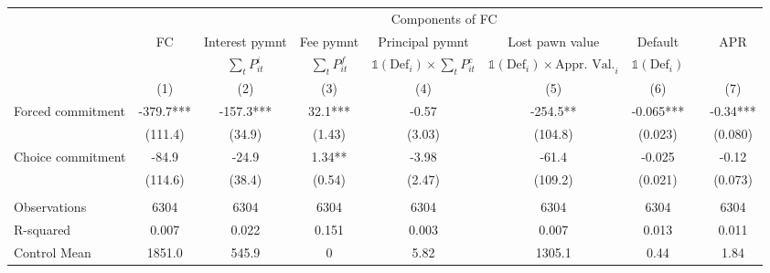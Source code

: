 \begin{tabular}{lcccccccc}
\toprule
      &       & \multicolumn{5}{c}{Components of FC}  &       &  \\
\cmidrule{3-7}      & FC    & Interest pymnt & Fee pymnt & Principal pymnt & Lost pawn value & Default &       & APR \\
\cmidrule{2-2}\cmidrule{9-9}      &       & $\sum_t P^i_{it}$ & $\sum_t P^f_{it}$ & $\mathds{1}(\text{Def}_i)\times\sum_t P^c_{it}$ & $\mathds{1}(\text{Def}_i)\times \text{Appr. Val.}_i$ & $\mathds{1}(\text{Def}_i)$ &       &  \\
\midrule
      & (1)   & (2)   & (3)   & (4)   & (5)   & (6)   &       & (7) \\
\midrule
\midrule
Forced commitment & -379.7*** & -157.3*** & 32.1*** & -0.57 & -254.5** & -0.065*** &       & -0.34*** \\
      & (111.4) & (34.9) & (1.43) & (3.03) & (104.8) & (0.023) &       & (0.080) \\
Choice commitment & -84.9 & -24.9 & 1.34** & -3.98 & -61.4 & -0.025 &       & -0.12 \\
      & (114.6) & (38.4) & (0.54) & (2.47) & (109.2) & (0.021) &       & (0.073) \\
      &       &       &       &       &       &       &       &  \\
\midrule
Observations & 6304  & 6304  & 6304  & 6304  & 6304  & 6304  &       & 6304 \\
R-squared & 0.007 & 0.022 & 0.151 & 0.003 & 0.007 & 0.013 &       & 0.011 \\
Control Mean & 1851.0 & 545.9 & 0     & 5.82  & 1305.1 & 0.44  &       & 1.84 \\
\bottomrule
\bottomrule
\end{tabular}%

